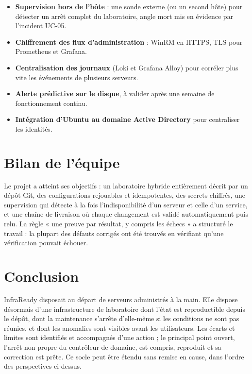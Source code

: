 \begin{itemize}
  \item \textbf{Supervision hors de l'hôte} : une sonde externe (ou un second hôte) pour détecter un arrêt
        complet du laboratoire, angle mort mis en évidence par l'incident UC-05.
  \item \textbf{Chiffrement des flux d'administration} : WinRM en HTTPS, TLS pour Prometheus et Grafana.
  \item \textbf{Centralisation des journaux} (Loki et Grafana Alloy) pour corréler plus vite les événements
        de plusieurs serveurs.
  \item \textbf{Alerte prédictive sur le disque}, à valider après une semaine de fonctionnement continu.
  \item \textbf{Intégration d'Ubuntu au domaine Active Directory} pour centraliser les identités.
\end{itemize}

\section{Bilan de l'équipe}

Le projet a atteint ses objectifs : un laboratoire hybride entièrement décrit par un dépôt Git, des
configurations rejouables et idempotentes, des secrets chiffrés, une supervision qui détecte à la
fois l'indisponibilité d'un serveur et celle d'un service, et une chaîne de livraison où chaque
changement est validé automatiquement puis relu. La règle « une preuve par résultat, y compris les
échecs » a structuré le travail : la plupart des défauts corrigés ont été trouvés en vérifiant
qu'une vérification pouvait échouer.


\section*{Conclusion}

InfraReady disposait au départ de serveurs administrés à la main. Elle dispose désormais d'une
infrastructure de laboratoire dont l'état est reproductible depuis le dépôt, dont la maintenance
s'arrête d'elle-même si les conditions ne sont pas réunies, et dont les anomalies sont visibles avant
les utilisateurs. Les écarts et limites sont identifiés et accompagnés d'une action ; le principal
point ouvert, l'arrêt non propre du contrôleur de domaine, est compris, reproduit et sa correction
est prête. Ce socle peut être étendu sans remise en cause, dans l'ordre des perspectives ci-dessus.
